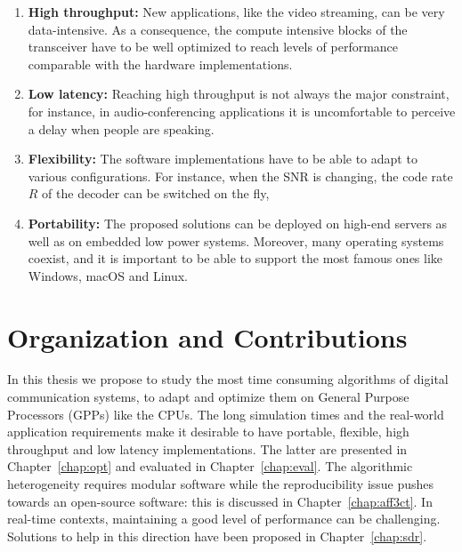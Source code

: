 \begin{enumerate}
  \item \textbf{High throughput:} New applications, like the video streaming,
    can be very data-intensive. As a consequence, the compute intensive blocks
    of the transceiver have to be well optimized to reach levels of performance
    comparable with the hardware implementations.
  \item \textbf{Low latency:} Reaching high throughput is not always the major
    constraint, for instance, in audio-conferencing applications it is
    uncomfortable to perceive a delay when people are speaking.
  \item \textbf{Flexibility:} The software implementations have to be able to
    adapt to various configurations. For instance, when the SNR is changing,
    the code rate $R$ of the decoder can be switched on the fly,
  \item \textbf{Portability:} The proposed solutions can be deployed on high-end
    servers as well as on embedded low power systems. Moreover, many operating
    systems coexist, and it is important to be able to support the most famous
    ones like Windows, macOS and Linux.
\end{enumerate}

\section{Organization and Contributions}


In this thesis we propose to study the most time consuming algorithms of digital
communication systems, to adapt and optimize them on General Purpose Processors
(GPPs) like the CPUs. The long simulation times and the real-world application
requirements make it desirable to have portable, flexible, high throughput and
low latency implementations. The latter are presented in Chapter~\ref{chap:opt}
and evaluated in Chapter~\ref{chap:eval}. The algorithmic heterogeneity requires
modular software while the reproducibility issue pushes towards an open-source
software: this is discussed in Chapter~\ref{chap:aff3ct}. In real-time contexts,
maintaining a good level of performance can be challenging. Solutions to help in
this direction have been proposed in Chapter~\ref{chap:sdr}.

